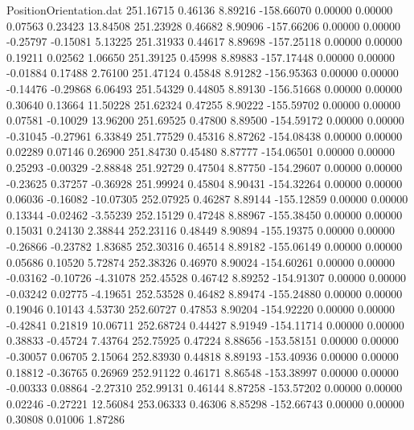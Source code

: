 \begin{filecontents}{PositionOrientation.dat}
 251.16715    0.46136    8.89216  -158.66070    0.00000    0.00000    0.07563    0.23423   13.84508
 251.23928    0.46682    8.90906  -157.66206    0.00000    0.00000   -0.25797   -0.15081    5.13225
 251.31933    0.44617    8.89698  -157.25118    0.00000    0.00000    0.19211    0.02562    1.06650
 251.39125    0.45998    8.89883  -157.17448    0.00000    0.00000   -0.01884    0.17488    2.76100
 251.47124    0.45848    8.91282  -156.95363    0.00000    0.00000   -0.14476   -0.29868    6.06493
 251.54329    0.44805    8.89130  -156.51668    0.00000    0.00000    0.30640    0.13664   11.50228
 251.62324    0.47255    8.90222  -155.59702    0.00000    0.00000    0.07581   -0.10029   13.96200
 251.69525    0.47800    8.89500  -154.59172    0.00000    0.00000   -0.31045   -0.27961    6.33849
 251.77529    0.45316    8.87262  -154.08438    0.00000    0.00000    0.02289    0.07146    0.26900
 251.84730    0.45480    8.87777  -154.06501    0.00000    0.00000    0.25293   -0.00329   -2.88848
 251.92729    0.47504    8.87750  -154.29607    0.00000    0.00000   -0.23625    0.37257   -0.36928
 251.99924    0.45804    8.90431  -154.32264    0.00000    0.00000    0.06036   -0.16082  -10.07305
 252.07925    0.46287    8.89144  -155.12859    0.00000    0.00000    0.13344   -0.02462   -3.55239
 252.15129    0.47248    8.88967  -155.38450    0.00000    0.00000    0.15031    0.24130    2.38844
 252.23116    0.48449    8.90894  -155.19375    0.00000    0.00000   -0.26866   -0.23782    1.83685
 252.30316    0.46514    8.89182  -155.06149    0.00000    0.00000    0.05686    0.10520    5.72874
 252.38326    0.46970    8.90024  -154.60261    0.00000    0.00000   -0.03162   -0.10726   -4.31078
 252.45528    0.46742    8.89252  -154.91307    0.00000    0.00000   -0.03242    0.02775   -4.19651
 252.53528    0.46482    8.89474  -155.24880    0.00000    0.00000    0.19046    0.10143    4.53730
 252.60727    0.47853    8.90204  -154.92220    0.00000    0.00000   -0.42841    0.21819   10.06711
 252.68724    0.44427    8.91949  -154.11714    0.00000    0.00000    0.38833   -0.45724    7.43764
 252.75925    0.47224    8.88656  -153.58151    0.00000    0.00000   -0.30057    0.06705    2.15064
 252.83930    0.44818    8.89193  -153.40936    0.00000    0.00000    0.18812   -0.36765    0.26969
 252.91122    0.46171    8.86548  -153.38997    0.00000    0.00000   -0.00333    0.08864   -2.27310
 252.99131    0.46144    8.87258  -153.57202    0.00000    0.00000    0.02246   -0.27221   12.56084
 253.06333    0.46306    8.85298  -152.66743    0.00000    0.00000    0.30808    0.01006    1.87286

\end{filecontents}
